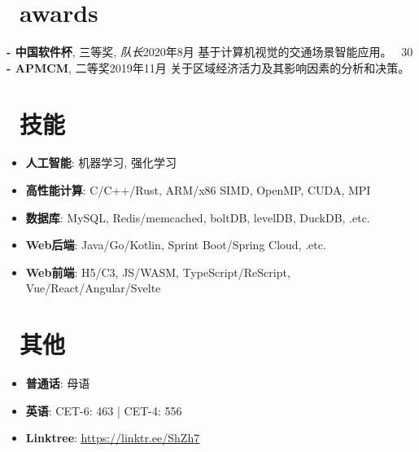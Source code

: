 \documentclass{common}
\begin{document}
\section{\faTrophy\ awards}
\award
    {\textbf{- 中国软件杯}, 三等奖, \textit{队长}}{2020年8月}
    {基于计算机视觉的交通场景智能应用。 
        {\href{https://github.com/Sh-Zh-7/intelligent-transportation-system}{\underline{\faGithub}} \faStarO\ 30}
    }
\award
    {\textbf{- APMCM}, 二等奖}{2019年11月}
    {关于区域经济活力及其影响因素的分析和决策。}

\section{\faCogs\ 技能}
\begin{itemize}[parsep=0.5ex]
    \item \textbf{人工智能}: 机器学习, 强化学习
    \item \textbf{高性能计算}: C/C++/Rust, ARM/x86 SIMD, OpenMP, CUDA, MPI
    \item \textbf{数据库}: MySQL, Redis/memcached, boltDB, levelDB, DuckDB, .etc.
    \item \textbf{Web后端}: Java/Go/Kotlin, Sprint Boot/Spring Cloud, .etc.
    \item \textbf{Web前端}: H5/C3, JS/WASM, TypeScript/ReScript, Vue/React/Angular/Svelte
\end{itemize}

\section{\faInfo\ 其他}
\begin{itemize}[parsep=0.5ex]
    \item \textbf{普通话}: 母语
    \item \textbf{英语}: CET-6: 463 | CET-4: 556
    \item \textbf{Linktree}: \href{https://linktr.ee/ShZh7}{\underline{https://linktr.ee/ShZh7}}
\end{itemize}
\end{document}
